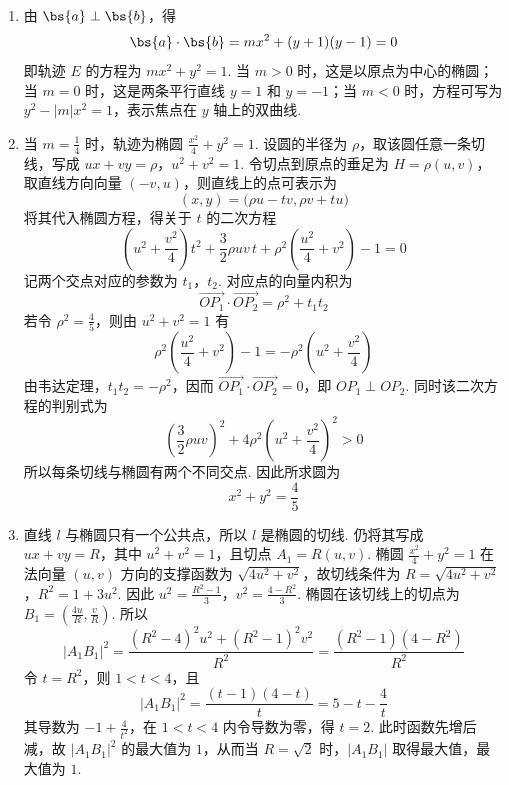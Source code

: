 \begin{solution}
\begin{enumerate}
\item 由 \(\bs{a}\perp\bs{b}\)，得
\[
\bs{a}\cdot\bs{b}=mx^2+(y+1)(y-1)=0
\]
即轨迹 \(E\) 的方程为 \(mx^2+y^2=1\). 当 \(m>0\) 时，这是以原点为中心的椭圆；当 \(m=0\) 时，这是两条平行直线 \(y=1\) 和 \(y=-1\)；当 \(m<0\) 时，方程可写为 \(y^2-\lvert m\rvert x^2=1\)，表示焦点在 \(y\) 轴上的双曲线.

\item 当 \(m=\frac14\) 时，轨迹为椭圆 \(\frac{x^2}{4}+y^2=1\). 设圆的半径为 \(\rho\)，取该圆任意一条切线，写成
\(ux+vy=\rho\)，\(u^2+v^2=1\).
令切点到原点的垂足为 \(H=\rho(u,v)\)，取直线方向向量 \((-v,u)\)，则直线上的点可表示为
\[
(x,y)=\bigl(\rho u-tv,\rho v+tu\bigr)
\]
将其代入椭圆方程，得关于 \(t\) 的二次方程
\[
\left(u^2+\frac{v^2}{4}\right)t^2+\frac{3}{2}\rho uv\,t+\rho^2\left(\frac{u^2}{4}+v^2\right)-1=0
\]
记两个交点对应的参数为 \(t_1\)，\(t_2\). 对应点的向量内积为
\[
\overrightarrow{OP_1}\cdot\overrightarrow{OP_2}=\rho^2+t_1t_2
\]
若令 \(\rho^2=\frac45\)，则由 \(u^2+v^2=1\) 有
\[
\rho^2\left(\frac{u^2}{4}+v^2\right)-1=-\rho^2\left(u^2+\frac{v^2}{4}\right)
\]
由韦达定理，\(t_1t_2=-\rho^2\)，因而 \(\overrightarrow{OP_1}\cdot\overrightarrow{OP_2}=0\)，即 \(OP_1\perp OP_2\). 同时该二次方程的判别式为
\[
\left(\frac32\rho uv\right)^2+4\rho^2\left(u^2+\frac{v^2}{4}\right)^2>0
\]
所以每条切线与椭圆有两个不同交点. 因此所求圆为
\[
x^2+y^2=\frac45
\]

\item 直线 \(l\) 与椭圆只有一个公共点，所以 \(l\) 是椭圆的切线. 仍将其写成 \(ux+vy=R\)，其中 \(u^2+v^2=1\)，且切点 \(A_1=R(u,v)\). 椭圆 \(\frac{x^2}{4}+y^2=1\) 在法向量 \((u,v)\) 方向的支撑函数为 \(\sqrt{4u^2+v^2}\)，故切线条件为
\(R=\sqrt{4u^2+v^2}\)，\(R^2=1+3u^2\).
因此 \(u^2=\frac{R^2-1}{3}\)，\(v^2=\frac{4-R^2}{3}\). 椭圆在该切线上的切点为 \(B_1=\left(\frac{4u}{R},\frac{v}{R}\right)\). 所以
\[
\lvert A_1B_1\rvert^2=\frac{(R^2-4)^2u^2+(R^2-1)^2v^2}{R^2}=\frac{(R^2-1)(4-R^2)}{R^2}
\]
令 \(t=R^2\)，则 \(1<t<4\)，且
\[
\lvert A_1B_1\rvert^2=\frac{(t-1)(4-t)}{t}=5-t-\frac4t
\]
其导数为 \(-1+\frac4{t^2}\)，在 \(1<t<4\) 内令导数为零，得 \(t=2\). 此时函数先增后减，故 \(\lvert A_1B_1\rvert^2\) 的最大值为 \(1\)，从而当 \(R=\sqrt2\) 时，\(\lvert A_1B_1\rvert\) 取得最大值，最大值为 \(1\).
\end{enumerate}
\end{solution}
